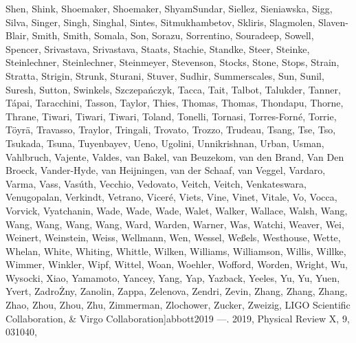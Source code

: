 \documentclass[times,tight]{aastex631}
\begin{document}
\begin{thebibliography}{}
{  {Shen}, {Shink}, {Shoemaker}, {Shoemaker}, {ShyamSundar}, {Siellez},
  {Sieniawska}, {Sigg}, {Silva}, {Singer}, {Singh}, {Singhal}, {Sintes},
  {Sitmukhambetov}, {Skliris}, {Slagmolen}, {Slaven-Blair}, {Smith}, {Smith},
  {Somala}, {Son}, {Sorazu}, {Sorrentino}, {Souradeep}, {Sowell}, {Spencer},
  {Srivastava}, {Srivastava}, {Staats}, {Stachie}, {Standke}, {Steer},
  {Steinke}, {Steinlechner}, {Steinlechner}, {Steinmeyer}, {Stevenson},
  {Stocks}, {Stone}, {Stops}, {Strain}, {Stratta}, {Strigin}, {Strunk},
  {Sturani}, {Stuver}, {Sudhir}, {Summerscales}, {Sun}, {Sunil}, {Suresh},
  {Sutton}, {Swinkels}, {Szczepa{\'n}czyk}, {Tacca}, {Tait}, {Talbot},
  {Talukder}, {Tanner}, {T{\'a}pai}, {Taracchini}, {Tasson}, {Taylor}, {Thies},
  {Thomas}, {Thomas}, {Thondapu}, {Thorne}, {Thrane}, {Tiwari}, {Tiwari},
  {Tiwari}, {Toland}, {Tonelli}, {Tornasi}, {Torres-Forn{\'e}}, {Torrie},
  {T{\"o}yr{\"a}}, {Travasso}, {Traylor}, {Tringali}, {Trovato}, {Trozzo},
  {Trudeau}, {Tsang}, {Tse}, {Tso}, {Tsukada}, {Tsuna}, {Tuyenbayev}, {Ueno},
  {Ugolini}, {Unnikrishnan}, {Urban}, {Usman}, {Vahlbruch}, {Vajente},
  {Valdes}, {van Bakel}, {van Beuzekom}, {van den Brand}, {Van Den Broeck},
  {Vander-Hyde}, {van Heijningen}, {van der Schaaf}, {van Veggel}, {Vardaro},
  {Varma}, {Vass}, {Vas{\'u}th}, {Vecchio}, {Vedovato}, {Veitch}, {Veitch},
  {Venkateswara}, {Venugopalan}, {Verkindt}, {Vetrano}, {Vicer{\'e}}, {Viets},
  {Vine}, {Vinet}, {Vitale}, {Vo}, {Vocca}, {Vorvick}, {Vyatchanin}, {Wade},
  {Wade}, {Wade}, {Walet}, {Walker}, {Wallace}, {Walsh}, {Wang}, {Wang},
  {Wang}, {Wang}, {Wang}, {Ward}, {Warden}, {Warner}, {Was}, {Watchi},
  {Weaver}, {Wei}, {Weinert}, {Weinstein}, {Weiss}, {Wellmann}, {Wen},
  {Wessel}, {We{\ss}els}, {Westhouse}, {Wette}, {Whelan}, {White}, {Whiting},
  {Whittle}, {Wilken}, {Williams}, {Williamson}, {Willis}, {Willke}, {Wimmer},
  {Winkler}, {Wipf}, {Wittel}, {Woan}, {Woehler}, {Wofford}, {Worden},
  {Wright}, {Wu}, {Wysocki}, {Xiao}, {Yamamoto}, {Yancey}, {Yang}, {Yap},
  {Yazback}, {Yeeles}, {Yu}, {Yu}, {Yuen}, {Yvert}, {Zadro{\.Z}ny}, {Zanolin},
  {Zappa}, {Zelenova}, {Zendri}, {Zevin}, {Zhang}, {Zhang}, {Zhang}, {Zhao},
  {Zhou}, {Zhou}, {Zhu}, {Zimmerman}, {Zlochower}, {Zucker}, {Zweizig}, {LIGO
  Scientific Collaboration}, \& {Virgo Collaboration}}]{abbott2019}
---. 2019, Physical Review X, 9, 031040, 


\end{thebibliography}
\end{document}
